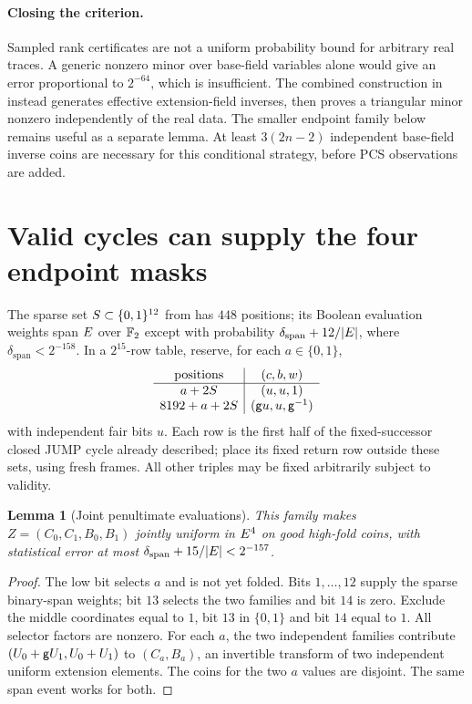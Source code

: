 \documentclass[11pt]{article}
\newtheorem{lemma}[proposition]{Lemma}
\begin{document}
\paragraph{Closing the criterion.} Sampled rank certificates are not a uniform probability bound for arbitrary real traces. A generic nonzero minor over base-field variables alone would give an error proportional to $2^{-64}$, which is insufficient. The combined construction in  instead generates effective extension-field inverses, then proves a triangular minor nonzero independently of the real data. The smaller endpoint family below remains useful as a separate lemma. At least $3(2n-2)$ independent base-field inverse coins are necessary for this conditional strategy, before PCS observations are added.

\section{Valid cycles can supply the four endpoint masks}

The sparse set $S\subset\{0,1\}^{12}$ from  has $448$ positions; its Boolean evaluation weights span $E$ over $\mathbb{F}_2$ except with probability $\delta_{\mathrm{span}}+12/|E|$, where $\delta_{\mathrm{span}}<2^{-158}$. In a $2^{15}$-row table, reserve, for each $a\in\{0,1\}$,
\[
\begin{array}{c|c}
\text{positions} & (c,b,w)\\\hline
a+2S & (u,u,1)\\
8192+a+2S & (\mathsf{g} u,u,\mathsf{g}^{-1})
\end{array}
\]
with independent fair bits $u$. Each row is the first half of the fixed-successor closed JUMP cycle already described; place its fixed return row outside these sets, using fresh frames. All other triples may be fixed arbitrarily subject to validity.

\begin{lemma}[Joint penultimate evaluations]\label{lem:jump-endpoints}
This family makes $Z=(C_0,C_1,B_0,B_1)$ jointly uniform in $E^4$ on good high-fold coins, with statistical error at most $\delta_{\mathrm{span}}+15/|E|<2^{-157}$.
\end{lemma}
\begin{proof}
The low bit selects $a$ and is not yet folded. Bits $1,\ldots,12$ supply the sparse binary-span weights; bit $13$ selects the two families and bit $14$ is zero. Exclude the middle coordinates equal to $1$, bit $13$ in $\{0,1\}$ and bit $14$ equal to $1$. All selector factors are nonzero. For each $a$, the two independent families contribute $(U_0+\mathsf{g} U_1,U_0+U_1)$ to $(C_a,B_a)$, an invertible transform of two independent uniform extension elements. The coins for the two $a$ values are disjoint. The same span event works for both.
\end{proof}
\end{document}
